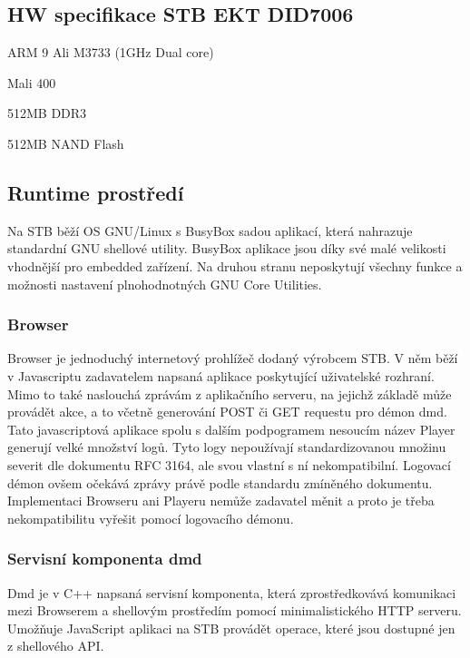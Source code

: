 \documentclass[thesis=B,czech]{FITthesis}[2012/06/26]
\begin{document}
\subsection{HW specifikace STB EKT DID7006}
\begin{description}
\setlength\itemsep{-1ex}
  \item [CPU:] ARM 9 Ali M3733 (1GHz Dual core)
  \item [GPU:] Mali 400
  \item [RAM:] 512MB DDR3
  \item [Perzistentní paměť:] 512MB NAND Flash
\end{description}

\subsection{Runtime prostředí}
Na STB běží OS GNU/Linux s BusyBox sadou aplikací, která nahrazuje standardní GNU shellové utility. BusyBox aplikace jsou díky své malé velikosti vhodnější pro embedded zařízení. Na druhou stranu neposkytují všechny funkce a možnosti nastavení plnohodnotných GNU Core Utilities.

\subsubsection{Browser}
Browser je jednoduchý internetový prohlížeč dodaný výrobcem STB.
V něm běží v Javascriptu zadavatelem napsaná aplikace poskytující uživatelské rozhraní. Mimo to také naslouchá zprávám z aplikačního serveru, na jejichž základě může provádět akce, a to včetně generování POST či GET requestu pro démon dmd.
Tato javascriptová aplikace spolu s dalším podpogramem nesoucím název Player generují velké množství logů. Tyto logy nepoužívají standardizovanou množinu severit dle dokumentu RFC 3164, ale svou vlastní s ní nekompatibilní. Logovací démon ovšem očekává zprávy právě podle standardu zmíněného dokumentu. Implementaci Browseru ani Playeru nemůže zadavatel měnit a proto je třeba nekompatibilitu vyřešit pomocí logovacího démonu.

\subsubsection{Servisní komponenta dmd}
Dmd je v C++ napsaná servisní komponenta, která zprostředkovává komunikaci mezi Browserem a shellovým prostředím pomocí minimalistického HTTP serveru. Umožňuje JavaScript aplikaci na STB provádět operace, které jsou dostupné jen z shellového API.
\end{document}
